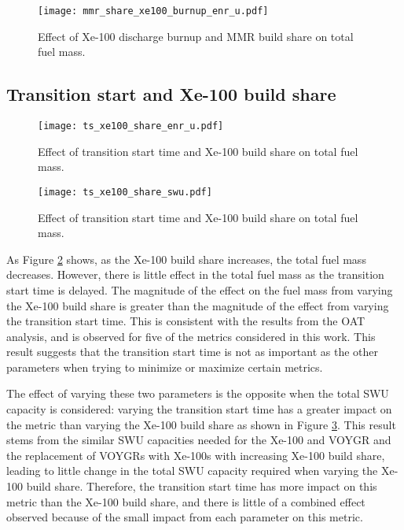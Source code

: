 \begin{figure}[h!]
    \centering
    \texttt{[image: mmr\_share\_xe100\_burnup\_enr\_u.pdf]}
    \caption{Effect of Xe-100 discharge burnup and MMR build share 
    on total fuel mass.}
    \label{fig:mmr_share_xe100_burnup_enr_u}
\end{figure}


\subsection{Transition start and Xe-100 build share}

\begin{figure}[h!]
    \centering
    \texttt{[image: ts\_xe100\_share\_enr\_u.pdf]}
    \caption{Effect of transition start time and Xe-100 build share 
    on total fuel mass.}
    \label{fig:ts_xe100_share_enr_u}
\end{figure}


\begin{figure}[h!]
    \centering
    \texttt{[image: ts\_xe100\_share\_swu.pdf]}
    \caption{Effect of transition start time and Xe-100 build share 
    on total fuel mass.}
    \label{fig:ts_xe100_share_swu}
\end{figure}

As Figure \ref{fig:ts_xe100_share_enr_u} shows, as the Xe-100 build 
share increases, the total fuel mass decreases. However, there is little 
effect in the total fuel mass as the transition start time is delayed. 
The magnitude of the effect on the fuel mass 
from varying the Xe-100 build share is greater than the magnitude of 
the effect from varying the transition start time. This is consistent 
with the results from the \gls{OAT} analysis, and is observed for five 
of the metrics considered in this work. This result suggests that the 
transition start time is not as important as the other parameters when 
trying to minimize or maximize certain metrics. 

The effect of varying these two parameters is the opposite when the total 
\gls{SWU} capacity is considered: varying the transition start time has 
a greater impact on the metric than varying the Xe-100 build share 
as shown in Figure \ref{fig:ts_xe100_share_swu}. This 
result stems from the similar \gls{SWU} capacities needed for the Xe-100 
and VOYGR and the replacement of VOYGRs with Xe-100s with 
increasing Xe-100 build share, leading to little change in the total 
\gls{SWU} capacity required  when 
varying the Xe-100 build share. Therefore, the transition start time has 
more impact on this metric than the Xe-100 build share, and there is little 
of a combined effect observed because of the small impact from each parameter 
on this metric. 
